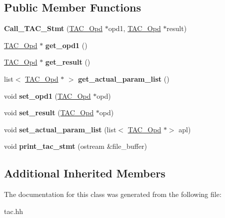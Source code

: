 \subsection*{Public Member Functions}
\begin{DoxyCompactItemize}
\item 
\mbox{\label{classCall__TAC__Stmt_af71e8f7154076070f38a1238fb5a8229}} 
{\bfseries Call\+\_\+\+T\+A\+C\+\_\+\+Stmt} (\hyperlink{classTAC__Opd}{T\+A\+C\+\_\+\+Opd} $\ast$opd1, \hyperlink{classTAC__Opd}{T\+A\+C\+\_\+\+Opd} $\ast$result)
\item 
\mbox{\label{classCall__TAC__Stmt_a04b24421ef58a80b06d7a1bd5ff6d4a5}} 
\hyperlink{classTAC__Opd}{T\+A\+C\+\_\+\+Opd} $\ast$ {\bfseries get\+\_\+opd1} ()
\item 
\mbox{\label{classCall__TAC__Stmt_a28c9365b1f1146f3f8120b067a8ae6db}} 
\hyperlink{classTAC__Opd}{T\+A\+C\+\_\+\+Opd} $\ast$ {\bfseries get\+\_\+result} ()
\item 
\mbox{\label{classCall__TAC__Stmt_ab9a2475b55b6ba77afec39ea785ce7bf}} 
list$<$ \hyperlink{classTAC__Opd}{T\+A\+C\+\_\+\+Opd} $\ast$ $>$ {\bfseries get\+\_\+actual\+\_\+param\+\_\+list} ()
\item 
\mbox{\label{classCall__TAC__Stmt_af9269c7a28251eb0fde2ca1d801674f6}} 
void {\bfseries set\+\_\+opd1} (\hyperlink{classTAC__Opd}{T\+A\+C\+\_\+\+Opd} $\ast$opd)
\item 
\mbox{\label{classCall__TAC__Stmt_ae7ab3cde1e0f1f5288fb71932cbb2bc4}} 
void {\bfseries set\+\_\+result} (\hyperlink{classTAC__Opd}{T\+A\+C\+\_\+\+Opd} $\ast$opd)
\item 
\mbox{\label{classCall__TAC__Stmt_aa2ab0635b937cc9b6066ede61fd48aed}} 
void {\bfseries set\+\_\+actual\+\_\+param\+\_\+list} (list$<$ \hyperlink{classTAC__Opd}{T\+A\+C\+\_\+\+Opd} $\ast$$>$ apl)
\item 
\mbox{\label{classCall__TAC__Stmt_a24a3894a1d2ec4c3ea963565180d7fd8}} 
void {\bfseries print\+\_\+tac\+\_\+stmt} (ostream \&file\+\_\+buffer)
\end{DoxyCompactItemize}
\subsection*{Additional Inherited Members}


The documentation for this class was generated from the following file\+:\begin{DoxyCompactItemize}
\item 
tac.\+hh\end{DoxyCompactItemize}
